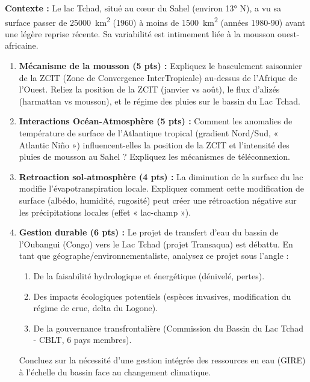 \documentclass[11pt]{article}
\begin{document}
\begin{exercice}
\textbf{Contexte :} Le lac Tchad, situé au cœur du Sahel (environ 13° N), a vu sa surface passer de \SI{25000}{\kilo\meter\squared} (1960) à moins de \SI{1500}{\kilo\meter\squared} (années 1980-90) avant une légère reprise récente. Sa variabilité est intimement liée à la mousson ouest-africaine.
\begin{enumerate}
    \item \textbf{Mécanisme de la mousson (5 pts) :} Expliquez le basculement saisonnier de la ZCIT (Zone de Convergence InterTropicale) au-dessus de l'Afrique de l'Ouest. Reliez la position de la ZCIT (janvier vs août), le flux d'alizés (harmattan vs mousson), et le régime des pluies sur le bassin du Lac Tchad.
    \item \textbf{Interactions Océan-Atmosphère (5 pts) :} Comment les anomalies de température de surface de l'Atlantique tropical (gradient Nord/Sud, « Atlantic Niño ») influencent-elles la position de la ZCIT et l'intensité des pluies de mousson au Sahel ? Expliquez les mécanismes de téléconnexion.
    \item \textbf{Retroaction sol-atmosphère (4 pts) :} La diminution de la surface du lac modifie l'évapotranspiration locale. Expliquez comment cette modification de surface (albédo, humidité, rugosité) peut créer une rétroaction négative sur les précipitations locales (effet « lac-champ »).
    \item \textbf{Gestion durable (6 pts) :} Le projet de transfert d'eau du bassin de l'Oubangui (Congo) vers le Lac Tchad (projet Transaqua) est débattu. En tant que géographe/environnementaliste, analysez ce projet sous l'angle :
    \begin{enumerate}
        \item De la faisabilité hydrologique et énergétique (dénivelé, pertes).
        \item Des impacts écologiques potentiels (espèces invasives, modification du régime de crue, delta du Logone).
        \item De la gouvernance transfrontalière (Commission du Bassin du Lac Tchad - CBLT, 6 pays membres).
    \end{enumerate}
    Concluez sur la nécessité d'une gestion intégrée des ressources en eau (GIRE) à l'échelle du bassin face au changement climatique.
\end{enumerate}
\end{exercice}
\end{document}
